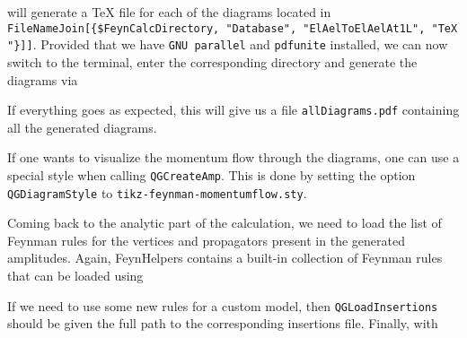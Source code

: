 \documentclass[../FeynHelpersManual.tex]{subfiles}
\begin{document}
\begin{Shaded}
\begin{Highlighting}[]
\OperatorTok{[}\OperatorTok{,}\OtherTok{{-}\textgreater{}}\OperatorTok{]}\NormalTok{;}
\end{Highlighting}
\end{Shaded}

will generate a TeX file for each of the diagrams located in
\texttt{FileNameJoin[\allowbreak{}\{\allowbreak{}\$FeynCalcDirectory,\ \allowbreak{}"Database",\ \allowbreak{}"ElAelToElAelAt1L",\ \allowbreak{}"TeX"\}]]}.
Provided that we have \texttt{GNU parallel} and \texttt{pdfunite}
installed, we can now switch to the terminal, enter the corresponding
directory and generate the diagrams via

\begin{Shaded}
\begin{Highlighting}[]
\SpecialCharTok{/}
\SpecialCharTok{/}
\end{Highlighting}
\end{Shaded}

If everything goes as expected, this will give us a file
\texttt{allDiagrams.pdf} containing all the generated diagrams.

If one wants to visualize the momentum flow through the diagrams, one
can use a special style when calling \texttt{QGCreateAmp}. This is done
by setting the option \texttt{QGDiagramStyle} to
\texttt{tikz-feynman-momentumflow.sty}.

Coming back to the analytic part of the calculation, we need to load the
list of Feynman rules for the vertices and propagators present in the
generated amplitudes. Again, FeynHelpers contains a built-in collection
of Feynman rules that can be loaded using

\begin{Shaded}
\begin{Highlighting}[]
\OperatorTok{[}\OperatorTok{]}\NormalTok{;}
\end{Highlighting}
\end{Shaded}

If we need to use some new rules for a custom model, then
\texttt{QGLoadInsertions} should be given the full path to the
corresponding insertions file. Finally, with

\begin{Shaded}
\begin{Highlighting}[]
\ExtensionTok{=}\OperatorTok{[}\OperatorTok{,}\OtherTok{{-}\textgreater{}}\OperatorTok{]}\NormalTok{;}
\end{Highlighting}
\end{Shaded}
\end{document}
